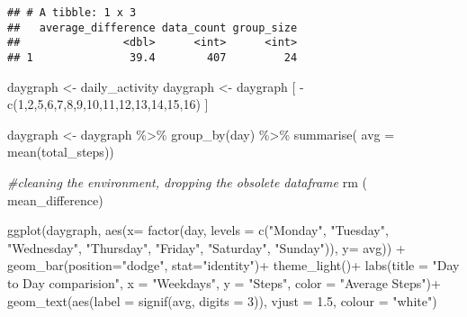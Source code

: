 \documentclass[
]{article}
\newenvironment{Shaded}{\begin{snugshade}}{\end{snugshade}}
\newcommand{\AttributeTok}[1]{\textcolor[rgb]{0.77,0.63,0.00}{#1}}
\newcommand{\CommentTok}[1]{\textcolor[rgb]{0.56,0.35,0.01}{\textit{#1}}}
\newcommand{\DecValTok}[1]{\textcolor[rgb]{0.00,0.00,0.81}{#1}}
\newcommand{\FloatTok}[1]{\textcolor[rgb]{0.00,0.00,0.81}{#1}}
\newcommand{\FunctionTok}[1]{\textcolor[rgb]{0.00,0.00,0.00}{#1}}
\newcommand{\NormalTok}[1]{#1}
\newcommand{\OtherTok}[1]{\textcolor[rgb]{0.56,0.35,0.01}{#1}}
\newcommand{\SpecialCharTok}[1]{\textcolor[rgb]{0.00,0.00,0.00}{#1}}
\newcommand{\StringTok}[1]{\textcolor[rgb]{0.31,0.60,0.02}{#1}}
\begin{document}
\begin{verbatim}
## # A tibble: 1 x 3
##   average_difference data_count group_size
##                <dbl>      <int>      <int>
## 1               39.4        407         24
\end{verbatim}

\begin{Shaded}
\begin{Highlighting}[]
\NormalTok{     daygraph }\OtherTok{\textless{}{-}}\NormalTok{ daily\_activity}
\NormalTok{ daygraph }\OtherTok{\textless{}{-}}\NormalTok{ daygraph [ }\SpecialCharTok{{-}}\FunctionTok{c}\NormalTok{(}\DecValTok{1}\NormalTok{,}\DecValTok{2}\NormalTok{,}\DecValTok{5}\NormalTok{,}\DecValTok{6}\NormalTok{,}\DecValTok{7}\NormalTok{,}\DecValTok{8}\NormalTok{,}\DecValTok{9}\NormalTok{,}\DecValTok{10}\NormalTok{,}\DecValTok{11}\NormalTok{,}\DecValTok{12}\NormalTok{,}\DecValTok{13}\NormalTok{,}\DecValTok{14}\NormalTok{,}\DecValTok{15}\NormalTok{,}\DecValTok{16}\NormalTok{) ]}
 
\NormalTok{   daygraph }\OtherTok{\textless{}{-}}\NormalTok{ daygraph }\SpecialCharTok{\%\textgreater{}\%}
     \FunctionTok{group\_by}\NormalTok{(day) }\SpecialCharTok{\%\textgreater{}\%}
     \FunctionTok{summarise}\NormalTok{(}
     \AttributeTok{avg =} \FunctionTok{mean}\NormalTok{(total\_steps))}
   
   
 \CommentTok{\#cleaning the environment, dropping the obsolete dataframe}
 \FunctionTok{rm}\NormalTok{ ( mean\_difference)}
\end{Highlighting}
\end{Shaded}

\begin{Shaded}
\begin{Highlighting}[]
\FunctionTok{ggplot}\NormalTok{(daygraph, }\FunctionTok{aes}\NormalTok{(}\AttributeTok{x=} \FunctionTok{factor}\NormalTok{(day, }\AttributeTok{levels =} \FunctionTok{c}\NormalTok{(}\StringTok{"Monday"}\NormalTok{, }\StringTok{"Tuesday"}\NormalTok{, }\StringTok{"Wednesday"}\NormalTok{, }\StringTok{"Thursday"}\NormalTok{, }\StringTok{"Friday"}\NormalTok{, }\StringTok{"Saturday"}\NormalTok{, }\StringTok{"Sunday"}\NormalTok{)), }\AttributeTok{y=}\NormalTok{ avg)) }\SpecialCharTok{+}
  \FunctionTok{geom\_bar}\NormalTok{(}\AttributeTok{position=}\StringTok{"dodge"}\NormalTok{, }\AttributeTok{stat=}\StringTok{"identity"}\NormalTok{)}\SpecialCharTok{+}
  \FunctionTok{theme\_light}\NormalTok{()}\SpecialCharTok{+}
    \FunctionTok{labs}\NormalTok{(}\AttributeTok{title =} \StringTok{"Day to Day comparision"}\NormalTok{, }
       \AttributeTok{x =} \StringTok{"Weekdays"}\NormalTok{, }\AttributeTok{y =} \StringTok{"Steps"}\NormalTok{,}
       \AttributeTok{color =} \StringTok{"Average Steps"}\NormalTok{)}\SpecialCharTok{+}
  \FunctionTok{geom\_text}\NormalTok{(}\FunctionTok{aes}\NormalTok{(}\AttributeTok{label =} \FunctionTok{signif}\NormalTok{(avg, }\AttributeTok{digits =} \DecValTok{3}\NormalTok{)),  }\AttributeTok{vjust =} \FloatTok{1.5}\NormalTok{, }\AttributeTok{colour =} \StringTok{"white"}\NormalTok{)}
\end{Highlighting}
\end{Shaded}
\end{document}

